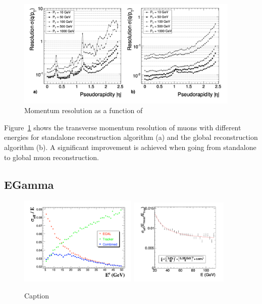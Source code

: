 \begin{figure}[ht]
    \centering
    \includegraphics[width=0.95\textwidth]{chapters/CMSExperiment/sectionReconstruction/figures/resMu.png}
    \caption{Momentum resolution as a function of }
    \label{fig:cmsexperiment:reconstruction:resMu}
\end{figure}


Figure~\ref{fig:cmsexperiment:reconstruction:resMu} shows the transverse momentum resolution of muons with different energies for standalone reconstruction algorithm (a) and the global reconstruction algorithm (b). A significant improvement is achieved when going from standalone to global muon reconstruction.





\subsection{EGamma}

\begin{figure}[ht]
    \centering
    \includegraphics[width=0.5\textwidth]{chapters/CMSExperiment/sectionReconstruction/figures/resEle.png}
    \includegraphics[width=0.42\textwidth]{chapters/CMSExperiment/sectionReconstruction/figures/resGamma.png}
    \caption{Caption}
    \label{fig:cmsexperiment:reconstruction:resEle}
\end{figure}

